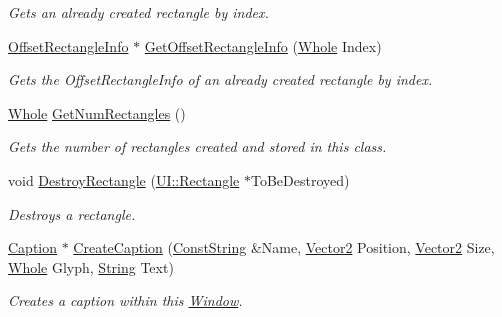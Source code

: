 \begin{DoxyCompactItemize}
\begin{DoxyCompactList}\small\item\em Gets an already created rectangle by index. \item\end{DoxyCompactList}\item 
\hyperlink{structphys_1_1UI_1_1ResizingInfo}{OffsetRectangleInfo} $\ast$ \hyperlink{classphys_1_1UI_1_1Window_a4661554adce63570ae43016f358b2893}{GetOffsetRectangleInfo} (\hyperlink{namespacephys_a460f6bc24c8dd347b05e0366ae34f34a}{Whole} Index)
\begin{DoxyCompactList}\small\item\em Gets the OffsetRectangleInfo of an already created rectangle by index. \item\end{DoxyCompactList}\item 
\hyperlink{namespacephys_a460f6bc24c8dd347b05e0366ae34f34a}{Whole} \hyperlink{classphys_1_1UI_1_1Window_a4d2d8821df32a920e7389b37f50f7c6d}{GetNumRectangles} ()
\begin{DoxyCompactList}\small\item\em Gets the number of rectangles created and stored in this class. \item\end{DoxyCompactList}\item 
void \hyperlink{classphys_1_1UI_1_1Window_ab66c4c1d5f26e3f4fcdd34063b711365}{DestroyRectangle} (\hyperlink{classphys_1_1UI_1_1Rectangle}{UI::Rectangle} $\ast$ToBeDestroyed)
\begin{DoxyCompactList}\small\item\em Destroys a rectangle. \item\end{DoxyCompactList}\item 
\hyperlink{classphys_1_1UI_1_1Caption}{Caption} $\ast$ \hyperlink{classphys_1_1UI_1_1Window_a840c88419fc2874f6b2520c238bf33f1}{CreateCaption} (\hyperlink{namespacephys_a5ce5049f8b4bf88d6413c47b504ebb31}{ConstString} \&Name, \hyperlink{classphys_1_1Vector2}{Vector2} Position, \hyperlink{classphys_1_1Vector2}{Vector2} Size, \hyperlink{namespacephys_a460f6bc24c8dd347b05e0366ae34f34a}{Whole} Glyph, \hyperlink{namespacephys_aa03900411993de7fbfec4789bc1d392e}{String} Text)
\begin{DoxyCompactList}\small\item\em Creates a caption within this \hyperlink{classphys_1_1UI_1_1Window}{Window}. \item\end{DoxyCompactList}\item 

\end{DoxyCompactItemize}
